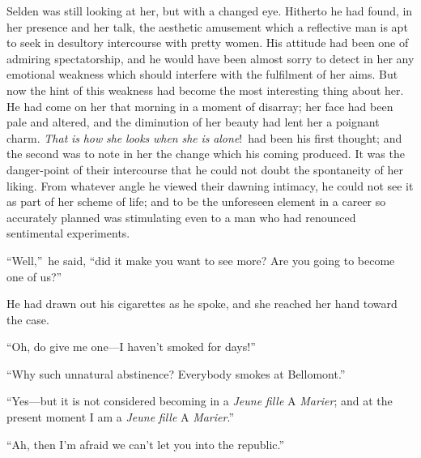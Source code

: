 \documentclass[12pt,a4paper]{book}
\begin{document}
Selden was still looking at her, but with a changed eye. Hitherto
he had found, in her presence and her talk, the aesthetic
amusement which a reflective man is apt to seek in desultory
intercourse with pretty women. His attitude had been one of
admiring spectatorship, and he would have been almost sorry to
detect in her any emotional weakness which should interfere with
the fulfilment of her aims. But now the hint of this weakness had
become the most interesting thing about her. He had come on her
that morning in a moment of disarray; her face had been pale and
altered, and the diminution of her beauty had lent her a poignant
charm. \textit{That} \textit{is} \textit{how} \textit{she} \textit{looks} \textit{when} \textit{she} \textit{is} \textit{alone}!\ had been his
first thought; and the second was to note in her the change which
his coming produced. It was the danger-point of their intercourse
that he could not doubt the spontaneity of her liking. From
whatever angle he viewed their dawning intimacy, he could not see
it as part of her scheme of life; and to be the unforeseen
element in a career so accurately planned was stimulating
even to a man who had renounced sentimental experiments.





``Well,''\ he said, ``did it make you want to see more? Are you going
to become one of us?''





He had drawn out his cigarettes as he spoke, and she reached her
hand toward the case.





``Oh, do give me one---I haven't smoked for days!''





``Why such unnatural abstinence? Everybody smokes at Bellomont.''





``Yes---but it is not considered becoming in a \textit{Jeune} \textit{fille} A
\textit{Marier}; and at the present moment I am a \textit{Jeune} \textit{fille} A \textit{Marier}.''





``Ah, then I'm afraid we can't let you into the republic.''
\end{document}
